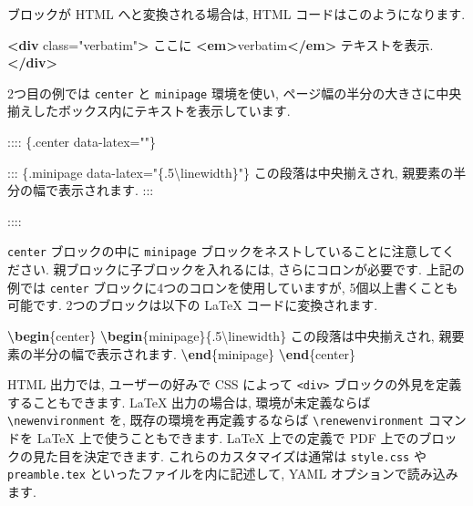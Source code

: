 \documentclass[
  11pt,
  lualatex,ja=standard,jafont=noto]{bxjsreport}
\newenvironment{Shaded}{\begin{snugshade}}{\end{snugshade}}
\newcommand{\ExtensionTok}[1]{#1}
\newcommand{\FunctionTok}[1]{\textcolor[rgb]{0.00,0.00,0.00}{#1}}
\newcommand{\KeywordTok}[1]{\textcolor[rgb]{0.13,0.29,0.53}{\textbf{#1}}}
\newcommand{\NormalTok}[1]{#1}
\newcommand{\OtherTok}[1]{\textcolor[rgb]{0.56,0.35,0.01}{#1}}
\newcommand{\StringTok}[1]{\textcolor[rgb]{0.31,0.60,0.02}{#1}}
\begin{document}
ブロックが HTML へと変換される場合は, HTML コードはこのようになります.

\begin{Shaded}
\begin{Highlighting}[]
\KeywordTok{\textless{}div}\OtherTok{ class=}\StringTok{"verbatim"}\KeywordTok{\textgreater{}}
\NormalTok{ここに }\KeywordTok{\textless{}em\textgreater{}}\NormalTok{verbatim}\KeywordTok{\textless{}/em\textgreater{}}\NormalTok{ テキストを表示.}
\KeywordTok{\textless{}/div\textgreater{}}
\end{Highlighting}
\end{Shaded}

2つ目の例では \texttt{center} と \texttt{minipage} 環境を使い, ページ幅の半分の大きさに中央揃えしたボックス内にテキストを表示しています.

\begin{Shaded}
\begin{Highlighting}[]
\NormalTok{:::: \{.center data{-}latex=""\}}

\NormalTok{::: \{.minipage data{-}latex="\{.5\textbackslash{}linewidth\}"\}}
\NormalTok{この段落は中央揃えされ, 親要素の半分の幅で表示されます.}
\NormalTok{:::}

\NormalTok{::::}
\end{Highlighting}
\end{Shaded}

\texttt{center} ブロックの中に \texttt{minipage} ブロックをネストしていることに注意してください. 親ブロックに子ブロックを入れるには, さらにコロンが必要です. 上記の例では \texttt{center} ブロックに4つのコロンを使用していますが, 5個以上書くことも可能です. 2つのブロックは以下の LaTeX コードに変換されます.

\begin{Shaded}
\begin{Highlighting}[]
\KeywordTok{\textbackslash{}begin}\NormalTok{\{}\ExtensionTok{center}\NormalTok{\}}
\KeywordTok{\textbackslash{}begin}\NormalTok{\{}\ExtensionTok{minipage}\NormalTok{\}\{.5}\FunctionTok{\textbackslash{}linewidth}\NormalTok{\}}
\NormalTok{この段落は中央揃えされ, 親要素の半分の幅で表示されます.}
\KeywordTok{\textbackslash{}end}\NormalTok{\{}\ExtensionTok{minipage}\NormalTok{\}}
\KeywordTok{\textbackslash{}end}\NormalTok{\{}\ExtensionTok{center}\NormalTok{\}}
\end{Highlighting}
\end{Shaded}

HTML 出力では, ユーザーの好みで CSS によって \texttt{\textless{}div\textgreater{}} ブロックの外見を定義することもできます. LaTeX 出力の場合は, 環境が未定義ならば \texttt{\textbackslash{}newenvironment} を, 既存の環境を再定義するならば \texttt{\textbackslash{}renewenvironment} コマンドを LaTeX 上で使うこともできます. LaTeX 上での定義で PDF 上でのブロックの見た目を決定できます. これらのカスタマイズは通常は \texttt{style.css} や \texttt{preamble.tex} といったファイルを内に記述して, YAML オプションで読み込みます.
\end{document}
